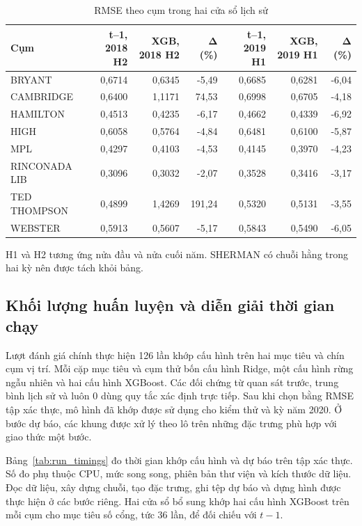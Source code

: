 \documentclass[conference,a4paper]{IEEEtran}
\begin{document}
\begin{table}[!t]
\caption{RMSE theo cụm trong hai cửa sổ lịch sử}
\label{tab:fold_clusters}
\centering\footnotesize
\setlength{\tabcolsep}{3pt}
\begin{tabularx}{\textwidth}{@{}Xrrrrrr@{}}
\toprule
\textbf{Cụm} & \textbf{t–1, 2018 H2} & \textbf{XGB, 2018 H2} & \textbf{Δ (\%)} & \textbf{t–1, 2019 H1} & \textbf{XGB, 2019 H1} & \textbf{Δ (\%)} \\
\midrule
BRYANT & 0,6714 & 0,6345 & -5,49 & 0,6685 & 0,6281 & -6,04 \\
CAMBRIDGE & 0,6400 & 1,1171 & 74,53 & 0,6998 & 0,6705 & -4,18 \\
HAMILTON & 0,4513 & 0,4235 & -6,17 & 0,4662 & 0,4339 & -6,92 \\
HIGH & 0,6058 & 0,5764 & -4,84 & 0,6481 & 0,6100 & -5,87 \\
MPL & 0,4297 & 0,4103 & -4,53 & 0,4145 & 0,3970 & -4,23 \\
RINCONADA LIB & 0,3096 & 0,3032 & -2,07 & 0,3528 & 0,3416 & -3,17 \\
TED THOMPSON & 0,4899 & 1,4269 & 191,24 & 0,5320 & 0,5131 & -3,55 \\
WEBSTER & 0,5913 & 0,5607 & -5,17 & 0,5843 & 0,5490 & -6,05 \\
\bottomrule
\end{tabularx}
\par\smallskip\raggedright\scriptsize H1 và H2 tương ứng nửa đầu và nửa cuối năm. SHERMAN có chuỗi hằng trong hai kỳ nên được tách khỏi bảng.
\end{table}


\subsection{Khối lượng huấn luyện và diễn giải thời gian chạy}

Lượt đánh giá chính thực hiện 126 lần khớp cấu hình trên hai mục tiêu và chín cụm vị trí. Mỗi cặp mục tiêu và cụm thử bốn cấu hình Ridge, một cấu hình rừng ngẫu nhiên và hai cấu hình XGBoost. Các đối chứng từ quan sát trước, trung bình lịch sử và luôn 0 dùng quy tắc xác định trực tiếp. Sau khi chọn bằng RMSE tập xác thực, mô hình đã khớp được sử dụng cho kiểm thử và kỳ năm 2020. Ở bước dự báo, các khung được xử lý theo lô trên những đặc trưng phù hợp với giao thức một bước.

Bảng~\ref{tab:run_timings} đo thời gian khớp cấu hình và dự báo trên tập xác thực. Số đo phụ thuộc CPU, mức song song, phiên bản thư viện và kích thước dữ liệu. Đọc dữ liệu, xây dựng chuỗi, tạo đặc trưng, ghi tệp dự báo và dựng hình được thực hiện ở các bước riêng. Hai cửa sổ bổ sung khớp hai cấu hình XGBoost trên mỗi cụm cho mục tiêu số cổng, tức 36 lần, để đối chiếu với $t-1$.
\end{document}
